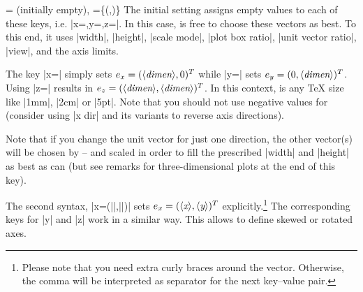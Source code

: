 \begin{pgfplotsxykeylist}{%
    \x= (initially empty),
    \x={\{(,)\}}%
}
    The initial setting assigns empty values to each of these keys, i.e.\@
    |x={},y={},z={}|. In this case, \PGFPlots{} is free to choose these vectors
    as best. To this end, it uses |width|, |height|, |scale mode|,
    |plot box ratio|, |unit vector ratio|, |view|, and the axis limits.

    The key |x=| simply sets $e_x = (\langle\textit{dimen}\rangle,0)^T $ while
    |y=| sets $e_y = (0,\langle\textit{dimen}\rangle)^T$. Using |z=|
    results in $e_z = (\langle\textit{dimen}\rangle,\langle\textit{dimen}\rangle)^T$. In this context,
     is any \TeX{} size like |1mm|, |2cm| or |5pt|. Note that you
    should not use negative values for  (consider using |x dir| and
    its variants to reverse axis directions).
\begin{codeexample}[]
\end{codeexample}

\begin{codeexample}[]
\end{codeexample}

    Note that if you change the unit vector for just one direction, the other
    vector(s) will be chosen by \PGFPlots{} -- and scaled in order to fill the
    prescribed |width| and |height| as best as \PGFPlots{} can (but see remarks
    for three-dimensional plots at the end of this key).
\begin{codeexample}[]
\end{codeexample}

    The second syntax, |x={(||,||)}| sets $e_x =
    (\langle\textit{x}\rangle,\langle\textit{y}\rangle)^T$ explicitly.\footnote{Please note that you need extra
    curly braces around the vector. Otherwise, the comma will be interpreted as
    separator for the next key--value pair.} The corresponding keys for |y| and
    |z| work in a similar way. This allows to define skewed or rotated axes.


\end{pgfplotsxykeylist}
